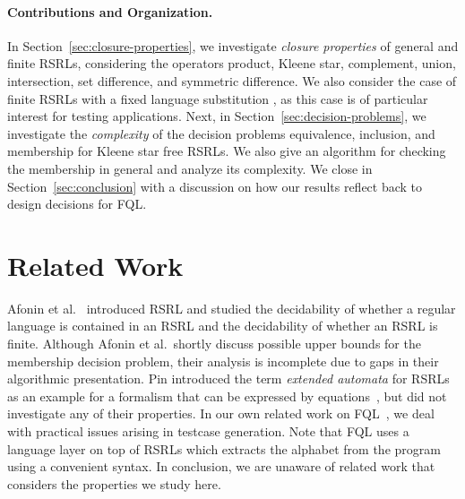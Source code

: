 \documentclass[envcountsame]{llncs}
\newcommand{\RegularlyGeneratedLanguageSetsAbbrev}{RSRLs\xspace}
\newcommand{\RegularlyGeneratedLanguageSetsStartAbbrev}{RSRL\xspace}
\newcommand{\FQL}{FQL\xspace}
\begin{document}
\paragraph{Contributions and Organization.}
In Section~\ref{sec:closure-properties}, we investigate \emph{closure
  properties} of general and finite
\RegularlyGeneratedLanguageSetsAbbrev, considering the operators
product, Kleene star, complement, union, intersection, set difference,
and symmetric difference.
We also consider the case of finite
\RegularlyGeneratedLanguageSetsAbbrev with a fixed language
substitution , as this case is of particular interest for
testing applications.
Next, in Section~\ref{sec:decision-problems}, we investigate the
\emph{complexity} of the decision problems equivalence, inclusion, and
membership for Kleene star free \RegularlyGeneratedLanguageSetsAbbrev.
We also give an algorithm for checking the membership in general and
analyze its complexity.
We close in Section~\ref{sec:conclusion} with a discussion on how our
results reflect back to design decisions for \FQL.

 \section{Related Work}

Afonin et al.~\cite{membership} introduced
\RegularlyGeneratedLanguageSetsStartAbbrev and studied the
decidability of whether a regular language is contained in an
\RegularlyGeneratedLanguageSetsStartAbbrev and the decidability of
whether an \RegularlyGeneratedLanguageSetsStartAbbrev is finite.
Although Afonin et al.~shortly discuss possible upper bounds for the
membership decision problem, their analysis is incomplete due to gaps
in their algorithmic presentation. 
Pin introduced the term \emph{extended automata} for
\RegularlyGeneratedLanguageSetsAbbrev as an example for a formalism that can be expressed by equations~\cite{Pin}, but
did not investigate any of their properties.
In our own related work on \FQL~\cite{FQL-ASE,holzer12:_provin_reach_using_fshel_compet_contr,holzer11:_seaml_testin_for_model_and_code,holzer10:_introd_to_test_specif_in_fql,holzer09:_query_dirven_progr_testin,holzer08,DBLP:conf/esop/BeyerHTV13}, we deal with practical
issues arising in testcase generation. Note that \FQL uses a language layer on top of 
\RegularlyGeneratedLanguageSetsAbbrev which extracts the alphabet from the program using
a convenient syntax. 
In conclusion, we are unaware of related work that considers the properties we study here.
\end{document}
